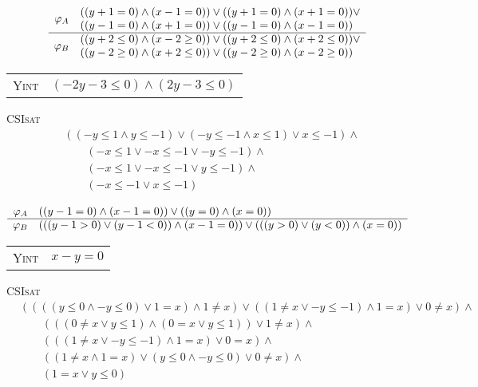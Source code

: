 \bigskip\centerline{}

\[\begin{array}{r l}
\multirow{2}{*}{$\varphi_A$}
& ((y+1=0) \wedge (x-1=0)) \vee ((y+1=0) \wedge (x+1=0)) \vee \\
& ((y-1=0) \wedge (x+1=0)) \vee ((y-1=0) \wedge (x-1=0)) \\
\hline
\multirow{2}{*}{$\varphi_B$}
& ((y+2 \leq 0) \wedge (x-2 \geq 0)) \vee ((y+2 \leq 0) \wedge (x+2 \leq 0)) \vee \\
& ((y-2 \geq 0) \wedge (x+2 \leq 0)) \vee ((y-2 \geq 0) \wedge (x-2 \geq 0))
\end{array}\]
\begin{tabular}{l c}
\textsc{Yint} & $(-2y-3 \leq 0) \wedge (2y-3 \leq 0)$
\end{tabular}

\bigskip\centerline{}

\textsc{CSIsat}
\begin{align*}
& ((-y \leq 1 \wedge y \leq -1) \vee (-y \leq -1 \wedge x \leq 1) \vee x \leq -1) \wedge \\
& \qquad (-x \leq 1 \vee -x \leq -1 \vee -y \leq -1) \wedge \\
& \qquad (-x \leq 1 \vee -x \leq -1 \vee y \leq -1) \wedge \\
& \qquad (-x \leq -1 \vee x \leq -1)
\end{align*}

\[\begin{array}{r l}
\varphi_A & ((y-1=0) \wedge (x-1=0)) \vee ((y=0) \wedge (x=0)) \\
\hline
\varphi_B & (((y-1>0) \vee (y-1<0)) \wedge (x-1=0)) \vee (((y>0) \vee (y<0)) \wedge (x=0))
\end{array}\]
\begin{tabular}{l c}
\textsc{Yint} & $x-y=0$
\end{tabular}

\textsc{CSIsat}
\begin{align*}
& ((((y \leq 0 \wedge -y \leq 0) \vee 1 = x) \wedge 1 \neq x) \vee ((1 \neq x \vee -y \leq -1) \wedge 1 = x) \vee 0 \neq x) \wedge \\
& \qquad (((0 \neq x \vee y \leq 1) \wedge (0 = x \vee y \leq 1)) \vee 1 \neq x) \wedge \\
& \qquad (((1 \neq x \vee -y \leq -1) \wedge 1 = x) \vee 0 = x) \wedge \\
& \qquad ((1 \neq x \wedge 1 = x) \vee (y \leq 0 \wedge -y \leq 0) \vee 0 \neq x) \wedge \\
& \qquad (1 = x \vee y \leq 0)
\end{align*}







